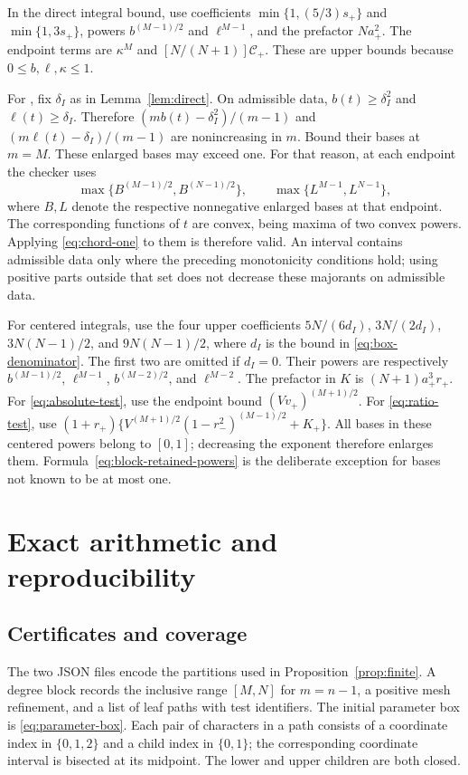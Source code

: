 \documentclass[11pt,reqno]{amsart}
\theoremstyle{definition}
\theoremstyle{remark}
\numberwithin{equation}{section}
\newcommand{\file}[1]{\texttt{\detokenize{#1}}}
\begin{document}
In the direct integral bound, use coefficients $\min\{1,(5/3)s_+\}$ and $\min\{1,3s_+\}$, powers $b^{(M-1)/2}$ and $\ell^{M-1}$, and the prefactor $Na_+^2$. The endpoint terms are $\kappa^M$ and $[N/(N+1)]\mathcal C_+$. These are upper bounds because $0\le b,\ell,\kappa\le1$.

For \file{direct_retained}, fix $\delta_I$ as in Lemma~\ref{lem:direct}. On admissible data, $b(t)\ge\delta_I^2$ and $\ell(t)\ge\delta_I$. Therefore
$(mb(t)-\delta_I^2)/(m-1)$ and $(m\ell(t)-\delta_I)/(m-1)$ are nonincreasing in $m$. Bound their bases at $m=M$. These enlarged bases may exceed one. For that reason, at each endpoint the checker uses
\begin{equation}\label{eq:block-retained-powers}
 \max\{B^{(M-1)/2},B^{(N-1)/2}\},\qquad
 \max\{L^{M-1},L^{N-1}\},
\end{equation}
where $B,L$ denote the respective nonnegative enlarged bases at that endpoint. The corresponding functions of $t$ are convex, being maxima of two convex powers. Applying \eqref{eq:chord-one} to them is therefore valid. An interval contains admissible data only where the preceding monotonicity conditions hold; using positive parts outside that set does not decrease these majorants on admissible data.

For centered integrals, use the four upper coefficients
$5N/(6d_I)$, $3N/(2d_I)$, $3N(N-1)/2$, and $9N(N-1)/2$, where $d_I$ is the bound in \eqref{eq:box-denominator}. The first two are omitted if $d_I=0$. Their powers are respectively $b^{(M-1)/2}$, $\ell^{M-1}$, $b^{(M-2)/2}$, and $\ell^{M-2}$. The prefactor in $K$ is $(N+1)a_+^3r_+$. For \eqref{eq:absolute-test}, use the endpoint bound $(Vv_+)^{(M+1)/2}$. For \eqref{eq:ratio-test}, use
$(1+r_+)\{V^{(M+1)/2}(1-r_-^2)^{(M-1)/2}+K_+\}$.
All bases in these centered powers belong to $[0,1]$; decreasing the exponent therefore enlarges them. Formula~\eqref{eq:block-retained-powers} is the deliberate exception for bases not known to be at most one.

\section{Exact arithmetic and reproducibility}\label{app:arithmetic}

\subsection{Certificates and coverage}

The two JSON files encode the partitions used in Proposition~\ref{prop:finite}. A degree block records the inclusive range $[M,N]$ for $m=n-1$, a positive mesh refinement, and a list of leaf paths with test identifiers. The initial parameter box is \eqref{eq:parameter-box}. Each pair of characters in a path consists of a coordinate index in $\{0,1,2\}$ and a child index in $\{0,1\}$; the corresponding coordinate interval is bisected at its midpoint. The lower and upper children are both closed.
\end{document}
